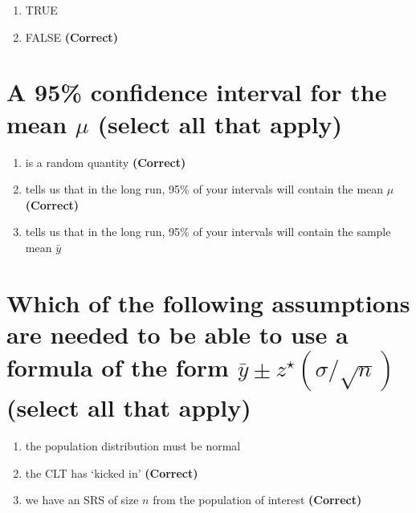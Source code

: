 \documentclass[letterpaper,10pt,twoside,printwatermark=false]{pinp}
\providecommand{\tightlist}{%
  \setlength{\itemsep}{0pt}\setlength{\parskip}{0pt}}
\begin{document}
\begin{enumerate}
\def\labelenumi{\arabic{enumi}.}
\tightlist
\item
  TRUE
\item
  FALSE \textbf{(Correct)}
\end{enumerate}

\section{\texorpdfstring{A 95\% confidence interval for the mean \(\mu\)
(select all that
apply)}{A 95\% confidence interval for the mean \textbackslash{}mu (select all that apply)}}\label{a-95-confidence-interval-for-the-mean-mu-select-all-that-apply}

\begin{enumerate}
\def\labelenumi{\arabic{enumi}.}
\tightlist
\item
  is a random quantity \textbf{(Correct)}
\item
  tells us that in the long run, 95\% of your intervals will contain the
  mean \(\mu\) \textbf{(Correct)}
\item
  tells us that in the long run, 95\% of your intervals will contain the
  sample mean \(\bar{y}\)
\end{enumerate}

\section{\texorpdfstring{Which of the following assumptions are needed
to be able to use a formula of the form
\(\bar{y} \pm z^\star (\sigma / \sqrt{n})\) (select all that
apply)}{Which of the following assumptions are needed to be able to use a formula of the form \textbackslash{}bar\{y\} \textbackslash{}pm z\^{}\textbackslash{}star (\textbackslash{}sigma / \textbackslash{}sqrt\{n\}) (select all that apply)}}\label{which-of-the-following-assumptions-are-needed-to-be-able-to-use-a-formula-of-the-form-bary-pm-zstar-sigma-sqrtn-select-all-that-apply}

\begin{enumerate}
\def\labelenumi{\arabic{enumi}.}
\tightlist
\item
  the population distribution must be normal
\item
  the CLT has `kicked in' \textbf{(Correct)}
\item
  we have an SRS of size \(n\) from the population of interest
  \textbf{(Correct)}
\end{enumerate}
\end{document}
